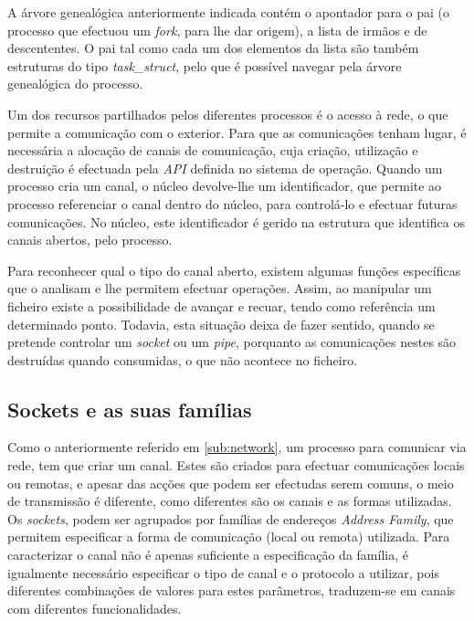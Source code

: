 A árvore genealógica anteriormente indicada contém o apontador para o pai (o processo que efectuou um \textit{fork}, para lhe dar origem), a lista de irmãos e de descententes.
O pai tal como cada um dos elementos da lista são também estruturas do tipo \textit{task\_struct}, pelo que é possível navegar pela árvore genealógica do processo.

Um dos recursos partilhados pelos diferentes processos é o acesso à rede, o que permite a comunicação com o exterior.
Para que as comunicações tenham lugar, é necessária a alocação de canais de comunicação, cuja criação, utilização e destruição é efectuada pela \textit{API} definida no sistema de operação.
Quando um processo cria um canal, o núcleo devolve-lhe um identificador, que permite ao processo referenciar o canal dentro do núcleo, para controlá-lo e efectuar futuras comunicações.
No núcleo, este identificador é gerido na estrutura que identifica os canais abertos, pelo processo.

Para reconhecer qual o tipo do canal aberto, existem algumas funções específicas que o analisam e lhe permitem efectuar operações.
Assim, ao manipular um ficheiro existe a possibilidade de avançar e recuar, tendo como referência um determinado ponto.
Todavia, esta situação deixa de fazer sentido, quando se pretende controlar um \textit{socket} ou um \textit{pipe}, porquanto as comunicações nestes são destruídas quando consumidas, o que não acontece no ficheiro.
 
\subsection{Sockets e as suas famílias}
\label{sub:sockets}



Como o anteriormente referido em \ref{sub:network}, um processo para comunicar via rede, tem que criar um canal.
Estes são criados para efectuar comunicações locais ou remotas, e apesar das acções que podem ser efectudas serem comuns, o meio de transmissão é diferente, como diferentes são os canais e as formas utilizadas.
Os \textit{sockets}, podem ser agrupados por famílias de endereços \textit{Address Family}, que permitem especificar a forma de comunicação (local ou remota) utilizada.
Para caracterizar o canal não é apenas suficiente a especificação da família, é igualmente necessário especificar o tipo de canal e o protocolo a utilizar, pois diferentes combinações de valores para estes parâmetros, traduzem-se em canais com diferentes funcionalidades.

